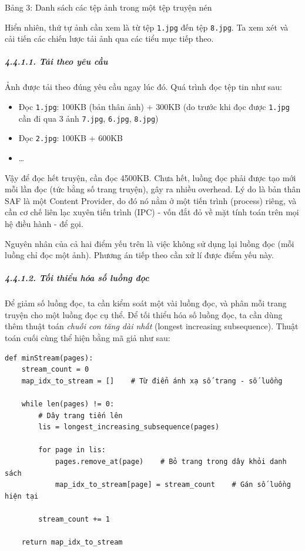 \documentclass[
]{article}
\begin{document}
Bảng 3: Danh sách các tệp ảnh trong một tệp truyện nén

Hiển nhiên, thứ tự ảnh cần xem là từ tệp \texttt{1.jpg} đến tệp
\texttt{8.jpg}. Ta xem xét và cải tiến các chiến lược tải ảnh qua các
tiểu mục tiếp theo.

\hypertarget{tux1ea3i-theo-yuxeau-cux1ea7u}{%
\subparagraph{4.4.1.1. Tải theo yêu
cầu}\label{tux1ea3i-theo-yuxeau-cux1ea7u}}

Ảnh được tải theo đúng yêu cầu ngay lúc đó. Quá trình đọc tệp tin như
sau:

\begin{itemize}
\item
  Đọc \texttt{1.jpg}: 100KB (bản thân ảnh) + 300KB (do trước khi đọc
  được \texttt{1.jpg} cần đi qua 3 ảnh \texttt{7.jpg}, \texttt{6.jpg},
  \texttt{8.jpg})
\item
  Đọc \texttt{2.jpg}: 100KB + 600KB
\item
  \ldots{}
\end{itemize}

Vậy để đọc hết truyện, cần đọc 4500KB. Chưa hết, luồng đọc phải được tạo
mới mỗi lần đọc (tức bằng số trang truyện), gây ra nhiều overhead. Lý do
là bản thân SAF là một Content Provider, do đó nó nằm ở một tiến trình
(process) riêng, và cần cơ chế liên lạc xuyên tiến trình (IPC) - vốn đắt
đỏ về mặt tính toán trên mọi hệ điều hành - để gọi.

Nguyên nhân của cả hai điểm yếu trên là việc không sử dụng lại luồng đọc
(mỗi luồng chỉ đọc một ảnh). Phương án tiếp theo cần xử lí được điểm yếu
này.

\hypertarget{tux1ed1i-thiux1ec3u-huxf3a-sux1ed1-luux1ed3ng-ux111ux1ecdc}{%
\subparagraph{4.4.1.2. Tối thiểu hóa số luồng
đọc}\label{tux1ed1i-thiux1ec3u-huxf3a-sux1ed1-luux1ed3ng-ux111ux1ecdc}}

Để giảm số luồng đọc, ta cần kiểm soát một vài luồng đọc, và phân mỗi
trang truyện cho một luồng đọc cụ thể. Để tối thiểu hóa số luồng đọc, ta
cần dùng thêm thuật toán \emph{chuỗi con tăng dài nhất} (longest
increasing subsequence). Thuật toán cuối cùng thể hiện bằng mã giả như
sau:

\begin{verbatim}
def minStream(pages):
    stream_count = 0
    map_idx_to_stream = []    # Từ điển ánh xạ số trang - số luồng

    while len(pages) != 0:
        # Dây trang tiến lên
        lis = longest_increasing_subsequence(pages)

        for page in lis:
            pages.remove_at(page)    # Bỏ trang trong dây khỏi danh sách
            map_idx_to_stream[page] = stream_count    # Gán số luồng hiện tại

        stream_count += 1

    return map_idx_to_stream
\end{verbatim}
\end{document}

